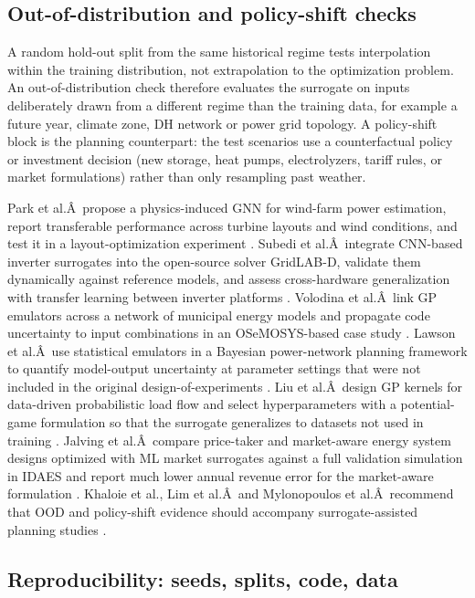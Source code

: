 \subsection{Out-of-distribution and policy-shift checks}
\label{sec:val:ood}

A random hold-out split from the same historical regime tests
interpolation within the training distribution, not extrapolation to the
optimization problem. An out-of-distribution check therefore evaluates
the surrogate on inputs deliberately drawn from a different regime than
the training data, for example a future year, climate zone, DH network
or power grid topology. A policy-shift block is the planning
counterpart: the test scenarios use a counterfactual policy or
investment decision (new storage, heat pumps, electrolyzers, tariff
rules, or market formulations) rather than only resampling past weather.

Park et al.Â~propose a physics-induced GNN for wind-farm power
estimation, report transferable performance across turbine layouts and
wind conditions, and test it in a layout-optimization experiment
\cite{Park2019}. Subedi et al.Â~integrate CNN-based inverter surrogates into
the open-source solver GridLAB-D, validate them dynamically against
reference models, and assess cross-hardware generalization with transfer
learning between inverter platforms \cite{Subedi2026157}. Volodina et
al.Â~link GP emulators across a network of municipal energy models and
propagate code uncertainty to input combinations in an OSeMOSYS-based
case study \cite{Volodina2022}. Lawson et al.Â~use statistical emulators in a
Bayesian power-network planning framework to quantify model-output
uncertainty at parameter settings that were not included in the original
design-of-experiments \cite{Lawson201647}. Liu et al.Â~design GP kernels for
data-driven probabilistic load flow and select hyperparameters with a
potential-game formulation so that the surrogate generalizes to datasets
not used in training \cite{Liu20222679}. Jalving et al.Â~compare price-taker
and market-aware energy system designs optimized with ML market
surrogates against a full validation simulation in IDAES and report much
lower annual revenue error for the market-aware formulation
\cite{Jalving2023}. Khaloie et al., Lim et al.Â~and Mylonopoulos et
al.Â~recommend that OOD and policy-shift evidence should
accompany surrogate-assisted planning studies
\cite{Khaloie2025,Lim2025,Mylonopoulos202332697}.

\subsection{Reproducibility: seeds, splits, code, data}
\label{sec:val:repro}

